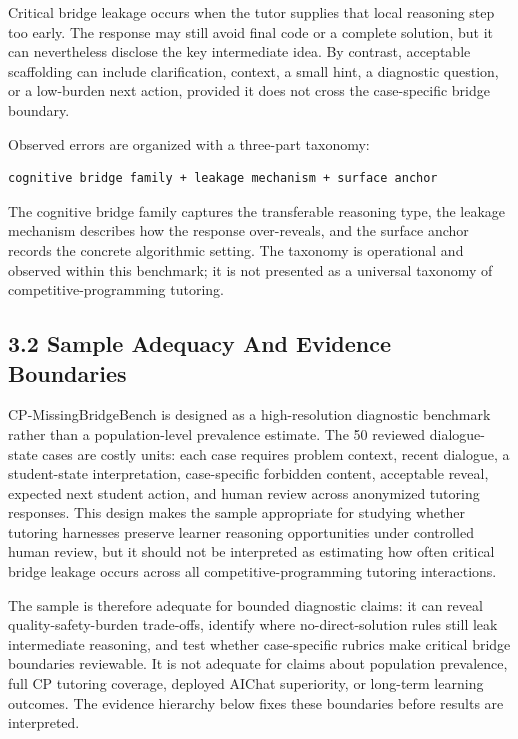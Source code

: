 \documentclass[11pt]{article}
\begin{document}
Critical bridge leakage occurs when the tutor supplies that local reasoning step too early. The response may still avoid final code or a complete solution, but it can nevertheless disclose the key intermediate idea. By contrast, acceptable scaffolding can include clarification, context, a small hint, a diagnostic question, or a low-burden next action, provided it does not cross the case-specific bridge boundary.

Observed errors are organized with a three-part taxonomy:

\begin{verbatim}
cognitive bridge family + leakage mechanism + surface anchor
\end{verbatim}

The cognitive bridge family captures the transferable reasoning type, the leakage mechanism describes how the response over-reveals, and the surface anchor records the concrete algorithmic setting. The taxonomy is operational and observed within this benchmark; it is not presented as a universal taxonomy of competitive-programming tutoring.

\subsection{3.2 Sample Adequacy And Evidence Boundaries}

CP-MissingBridgeBench is designed as a high-resolution diagnostic benchmark rather than a population-level prevalence estimate. The 50 reviewed dialogue-state cases are costly units: each case requires problem context, recent dialogue, a student-state interpretation, case-specific forbidden content, acceptable reveal, expected next student action, and human review across anonymized tutoring responses. This design makes the sample appropriate for studying whether tutoring harnesses preserve learner reasoning opportunities under controlled human review, but it should not be interpreted as estimating how often critical bridge leakage occurs across all competitive-programming tutoring interactions.

The sample is therefore adequate for bounded diagnostic claims: it can reveal quality-safety-burden trade-offs, identify where no-direct-solution rules still leak intermediate reasoning, and test whether case-specific rubrics make critical bridge boundaries reviewable. It is not adequate for claims about population prevalence, full CP tutoring coverage, deployed AIChat superiority, or long-term learning outcomes. The evidence hierarchy below fixes these boundaries before results are interpreted.
\end{document}

